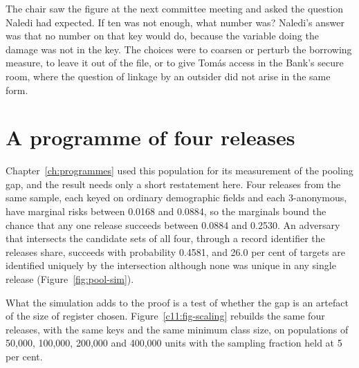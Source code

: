 The chair saw the figure at the next committee meeting and asked the question
Naledi had expected. If ten was not enough, what number was? Naledi's answer was
that no number on that key would do, because the variable doing the damage was not
in the key. The choices were to coarsen or perturb the borrowing measure, to leave
it out of the file, or to give Tomás access in the Bank's secure room, where the
question of linkage by an outsider did not arise in the same form.

\section{A programme of four releases}

Chapter~\ref{ch:programmes} used this population for its measurement of the pooling
gap, and the result needs only a short restatement here. Four releases from the same
sample, each keyed on ordinary demographic fields and each 3-anonymous, have
marginal risks between 0.0168 and 0.0884, so the marginals bound the chance that any
one release succeeds between 0.0884 and 0.2530. An adversary that intersects the
candidate sets of all four, through a record identifier the releases share,
succeeds with probability 0.4581, and 26.0 per cent of targets are identified
uniquely by the intersection although none was unique in any single release
(Figure~\ref{fig:pool-sim}).

What the simulation adds to the proof is a test of whether the gap is an artefact of
the size of register chosen. Figure~\ref{c11:fig-scaling} rebuilds the same four
releases, with the same keys and the same minimum class size, on populations of
50,000, 100,000, 200,000 and 400,000 units with the sampling fraction held at 5 per
cent.

